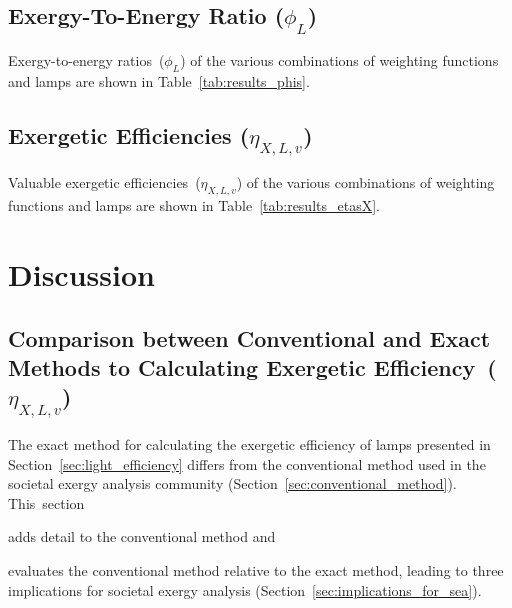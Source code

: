 \documentclass[energies,article,accept,moreauthors,pdftex]{Definitions/mdpi}\usepackage[]{graphicx}\usepackage[]{color}
\begin{document}




\subsection{Exergy-To-Energy Ratio ($\phi_L$)}
\label{sec:results_phi_L}

Exergy-to-energy ratios~($\phi_{L}$) of the various combinations of weighting functions and lamps
are shown in Table~\ref{tab:results_phis}.





\subsection{Exergetic Efficiencies ($\eta_{X,L,v}$)}
\label{sec:results_exergy_efficiencies}
Valuable exergetic efficiencies~($\eta_{X,L,v}$) of the various combinations of weighting functions and lamps
are shown in Table~\ref{tab:results_etasX}.





\section{Discussion}
\label{sec:discussion}


\subsection{Comparison between Conventional and Exact Methods
            to Calculating Exergetic Efficiency~($\eta_{X,L,v}$)}
\label{sec:compwithSEA}

The exact method for calculating the exergetic efficiency of lamps
presented in Section~\ref{sec:light_efficiency}
differs from the conventional method 
used in the societal exergy analysis community (Section~\ref{sec:conventional_method}).
\mbox{This section}
%
\begin{enumerate*}[label={(\alph*)}]

  \item adds detail to the conventional method and

  \item evaluates the conventional method relative to the exact method,
        leading to three implications for societal exergy analysis
        (Section~\ref{sec:implications_for_sea}).

\end{enumerate*}
\end{document}
